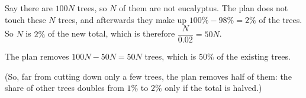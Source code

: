 Say there are $100N$ trees, so $N$ of them are not eucalyptus. The plan does not touch these $N$ trees, and afterwards they make up $100\%-98\%=2\%$ of the trees. So $N$ is $2\%$ of the new total, which is therefore $\dfrac{N}{0.02}=50N$.

The plan removes $100N-50N=50N$ trees, which is $\boxed{50\%}$ of the existing trees.

(So, far from cutting down only a few trees, the plan removes half of them: the share of other trees doubles from $1\%$ to $2\%$ only if the total is halved.)
